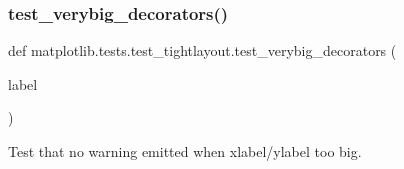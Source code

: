 \subsubsection{\texorpdfstring{test\+\_\+verybig\+\_\+decorators()}{test\_verybig\_decorators()}}
{\footnotesize\ttfamily def matplotlib.\+tests.\+test\+\_\+tightlayout.\+test\+\_\+verybig\+\_\+decorators (\begin{DoxyParamCaption}\item[{}]{label }\end{DoxyParamCaption})}

\begin{DoxyVerb}Test that no warning emitted when xlabel/ylabel too big.\end{DoxyVerb}
 